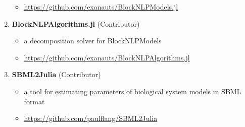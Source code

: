 \begin{enumerate}[itemsep=0pt]
\begin{itemize}[leftmargin=*,topsep=0pt,label=$\bullet$,topsep=-5pt,itemsep=-1pt]
  \item \url{https://github.com/exanauts/BlockNLPModels.jl}
  \end{itemize}
\item \textbf{BlockNLPAlgorithms.jl} (Contributor)
  \begin{itemize}[leftmargin=*,topsep=0pt,label=$\bullet$,topsep=-5pt,itemsep=-1pt]
  \item a decomposition solver for BlockNLPModels
  \item \url{https://github.com/exanauts/BlockNLPAlgorithms.jl}
  \end{itemize}
\item \textbf{SBML2Julia} (Contributor)
  \begin{itemize}[leftmargin=*,topsep=0pt,label=$\bullet$,topsep=-5pt,itemsep=-1pt]
  \item a tool for estimating parameters of biological system models in SBML format
  \item \url{https://github.com/paulflang/SBML2Julia}
  \end{itemize}
\end{enumerate}
